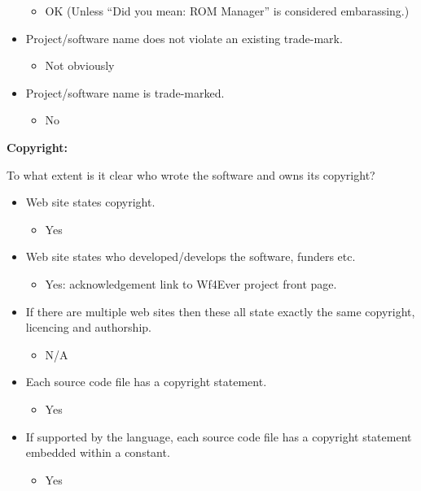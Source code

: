 \begin{itemize}
  \begin{itemize}
  \itemsep1pt\parskip0pt
  \item
    OK (Unless ``Did you mean: ROM Manager'' is considered embarassing.)
  \end{itemize}
\item
  Project/software name does not violate an existing trade-mark.

  \begin{itemize}
  \itemsep1pt\parskip0pt
  \item
    Not obviously
  \end{itemize}
\item
  Project/software name is trade-marked.

  \begin{itemize}
  \itemsep1pt\parskip0pt
  \item
    No
  \end{itemize}
\end{itemize}

\textbf{Copyright:}

To what extent is it clear who wrote the software and owns its
copyright?

\begin{itemize}
\itemsep1pt\parskip0pt
\item
  Web site states copyright.

  \begin{itemize}
  \itemsep1pt\parskip0pt
  \item
    Yes
  \end{itemize}
\item
  Web site states who developed/develops the software, funders etc.

  \begin{itemize}
  \itemsep1pt\parskip0pt
  \item
    Yes: acknowledgement link to Wf4Ever project front page.
  \end{itemize}
\item
  If there are multiple web sites then these all state exactly the same
  copyright, licencing and authorship.

  \begin{itemize}
  \itemsep1pt\parskip0pt
  \item
    N/A
  \end{itemize}
\item
  Each source code file has a copyright statement.

  \begin{itemize}
  \itemsep1pt\parskip0pt
  \item
    Yes
  \end{itemize}
\item
  If supported by the language, each source code file has a copyright
  statement embedded within a constant.

  \begin{itemize}
  \itemsep1pt\parskip0pt
  \item
    Yes
  \end{itemize}
\end{itemize}


